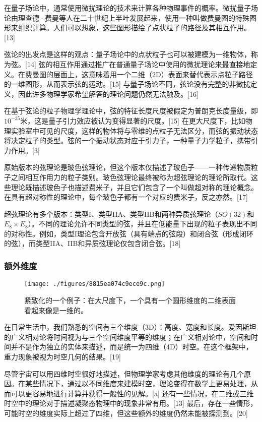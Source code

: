 在量子场论中，通常使用微扰理论的技术来计算各种物理事件的概率。微扰量子场论由理查德·费曼等人在二十世纪上半叶发展起来，使用一种叫做费曼图的特殊图形来组织计算。人们可以想象，这些图形描绘了点状粒子的路径及其相互作用。[13]

弦论的出发点是这样的观点：量子场论中的点状粒子也可以被建模为一维物体，称为弦。[14] 弦的相互作用通过推广在普通量子场论中使用的微扰理论来最直接地定义。在费曼图的层面上，这意味着用一个二维（2D）表面来替代表示点粒子路径的一维图形，从而表示弦的运动。[15] 与量子场论不同，弦论没有完整的非微扰定义，因此许多物理学家希望解答的理论问题仍然无法触及。[16]

在基于弦论的粒子物理学理论中，弦的特征长度尺度被假定为普朗克长度量级，即\(10^{-35}\)米，这是量子引力效应被认为变得显著的尺度。[15] 在更大尺度下，比如物理实验室中可见的尺度，这样的物体将与零维的点粒子无法区分，而弦的振动状态将决定粒子的类型。弦的一个振动状态对应于引力子，一种量子力学粒子，携带引力作用。[3]

原始版本的弦理论是玻色弦理论，但这个版本仅描述了玻色子——一种传递物质粒子之间相互作用力的粒子类别。玻色弦理论最终被称为超弦理论的理论所取代。这些理论既描述玻色子也描述费米子，并且它们包含了一个叫做超对称的理论概念。在具有超对称性的理论中，每个玻色子都有一个对应的费米子，反之亦然。[17]

超弦理论有多个版本：类型I、类型IIA、类型IIB和两种异质弦理论（\(SO(32)\)和\(E_8\times E_8\)）。不同的理论允许不同类型的弦，并且在低能量下出现的粒子表现出不同的对称性。例如，类型I理论包含开放弦（具有端点的弦段）和闭合弦（形成闭环的弦），而类型IIA、IIB和异质弦理论仅包含闭合弦。[18]
\subsubsection{额外维度}
\begin{figure}[ht]
\centering
\texttt{[image: ./figures/8815ea074c9ece9c.png]}
\caption{紧致化的一个例子：在大尺度下，一个具有一个圆形维度的二维表面看起来像是一维的。} \label{fig_String_3}
\end{figure}
在日常生活中，我们熟悉的空间有三个维度（3D）：高度、宽度和长度。爱因斯坦的广义相对论将时间视为与三个空间维度平等的维度；在广义相对论中，空间和时间并不是作为独立的实体来描述，而是统一为四维（4D）时空。在这个框架中，重力现象被视为时空几何的结果。[19]

尽管宇宙可以用四维时空很好地描述，但物理学家考虑其他维度的理论有几个原因。在某些情况下，通过以不同维度来建模时空，理论变得在数学上更易处理，从而可以更容易地进行计算并获得一般性的见解。[a] 还有一些情况，在二维或三维时空中的理论对于描述凝聚态物理中的现象非常有用。[13] 最后，存在一些情形，可能时空的维度实际上超过了四维，但这些额外的维度仍然未能被探测到。[20]

